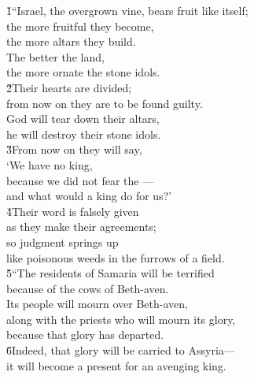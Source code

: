 \begin{poetry}
\poeml {}
\v{1}``Israel, the overgrown vine, bears fruit like itself; \\
\poeml the more fruitful they become, \\
\poemlll       the more altars they build. \\
\poeml The better the land, \\
\poemll    the more ornate the stone idols. \\
\poeml \v{2}Their hearts are divided; \\
\poemll    from now on they are to be found guilty. \\
\poeml God will tear down their altars, \\
\poemll    he will destroy their stone idols. \\
\poeml \v{3}From now on they will say, \\
\poemll    `We have no king, \\
\poemlll       because we did not fear the --- \\
\poemll    and what would a king do for us?' \\
\poeml \v{4}Their word is falsely given \\
\poemll    as they make their agreements; \\
\poeml so judgment springs up \\
\poemll    like poisonous weeds in the furrows of a field. \\
\poeml \v{5}``The residents of Samaria will be terrified \\
\poemll    because of the cows of Beth-aven. \\
\poeml Its people will mourn over Beth-aven, \\
\poemll    along with the priests who will mourn its glory, \\
\poemlll       because that glory has departed. \\
\poeml \v{6}Indeed, that glory will be carried to Assyria--- \\
\poemll    it will become a present for an avenging king. \\

\end{poetry}
